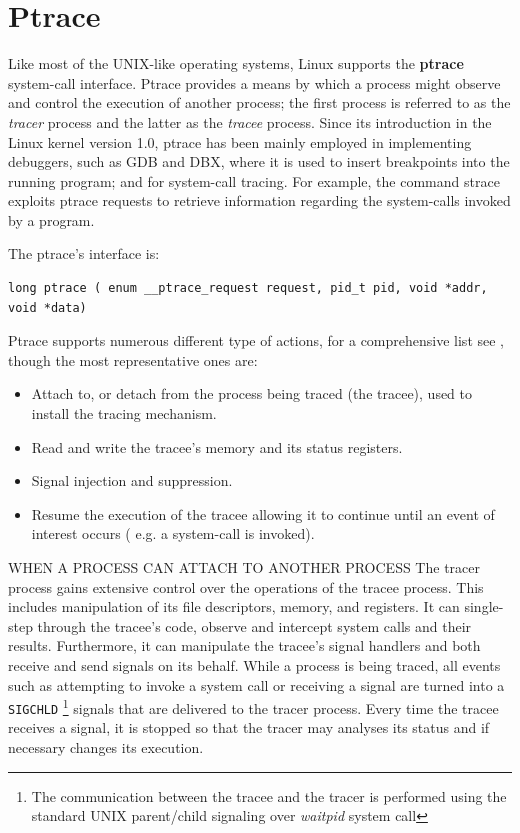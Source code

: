 \chapter{Ptrace}

Like most of the UNIX-like operating systems, Linux supports the \textbf{ptrace} system-call interface. Ptrace provides a means by which a process might observe and control the execution of another process; the first process is referred to as the \textit{tracer} process and the latter as the \textit{tracee} process. Since its introduction in the Linux kernel version 1.0,  ptrace has been mainly employed in implementing debuggers, such as GDB and DBX, where it is used to insert breakpoints into the running program; and for system-call tracing. For example, the command strace exploits ptrace requests to retrieve information regarding the system-calls invoked by a program. 

The ptrace's interface is:
\begin{center}
\begin{lstlisting}[caption={Synopsis ptrace system call}]
	long ptrace ( enum __ptrace_request request, pid_t pid, void *addr, void *data)
\end{lstlisting}
\end{center}

Ptrace supports numerous different type of actions, for a comprehensive list see  \cite{ptrace}, though the most representative ones are:

\begin{itemize}
\item Attach to, or detach from the process being traced (the tracee), used to install the tracing mechanism.  
\item Read and write the tracee's memory and its status registers.
\item Signal injection and suppression.
\item Resume the execution of the tracee allowing it to continue until 
	  an event of interest occurs ( e.g. a system-call is invoked).
\end{itemize} 

WHEN A PROCESS CAN ATTACH TO ANOTHER PROCESS
The tracer process gains extensive control over the operations of the tracee process. This includes manipulation of its file descriptors, memory, and registers. It can single-step through the tracee's code, observe and intercept system calls and their results. Furthermore, it can manipulate the tracee's signal handlers and both receive and send signals on its behalf. While a process is being traced, all events such as attempting to invoke a system call or receiving a signal are turned into a  \lstinline$SIGCHLD$ \footnote{The communication between the tracee and the tracer is performed using the standard UNIX parent/child signaling over \emph{waitpid} system call}  signals that are delivered to the tracer process. Every time the tracee receives a signal, it is stopped so that the tracer may analyses its status and if necessary changes its execution. 


